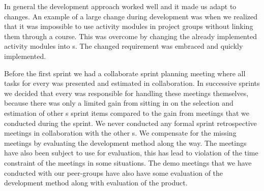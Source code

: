 In general the development approach worked well and it made us adapt to changes. 
An example of a large change during development was when we realized that it was impossible to use activity modules in project groups without linking them through a course.
This was overcome by changing the already implemented activity modules into \block[]s. 
The changed requirement was embraced and quickly implemented. 

Before the first sprint we had a collaborate sprint planning meeting where all tasks for every \subgroup{} was presented and estimated in collaboration.
In successive sprints we decided that every \subgroup{} was responsible for handling these meetings themselves, because there was only a limited gain from sitting in on the selection and estimation of other \subgroup{}s sprint items compared to the gain from \sos{} meetings that we conducted during the sprint.
We never conducted any formal sprint retrospective meetings in collaboration with the other \subgroup{}s.
We compensate for the missing meetings by evaluating the development method along the way.
The \sos{} meetings have also been subject to use for evaluation, this has lead to violation of the time constraint of the \sos{} meetings in some situations.
The demo meetings that we have conducted with our peer-groups have also have some evaluation of the development method along with  evaluation of the product.